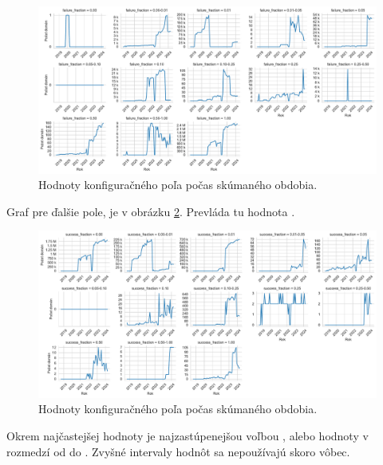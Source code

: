 \begin{figure}[!htb]
\begin{center}
 \includegraphics[scale=0.447]{obrazky-figures/httparchive_nel_config_ff_dist.pdf}
 \caption{\centering Hodnoty konfiguračného poľa  počas skúmaného obdobia.}
 \label{fig:httparchive-nel-config-ff-dist}
\end{center}
\end{figure}

Graf pre ďalšie pole,  je v obrázku \ref{fig:httparchive-nel-config-sf-dist}. 
Prevláda tu hodnota .

\begin{figure}[!htb]
\begin{center}
 \includegraphics[scale=0.447]{obrazky-figures/httparchive_nel_config_sf_dist.pdf}
 \caption{\centering Hodnoty konfiguračného poľa  počas skúmaného obdobia.}
 \label{fig:httparchive-nel-config-sf-dist}
\end{center}
\end{figure}

\pagebreak

Okrem najčastejšej hodnoty je najzastúpenejšou voľbou , alebo hodnoty v rozmedzí od  do .
Zvyšné intervaly hodnôt sa nepoužívajú skoro vôbec.

